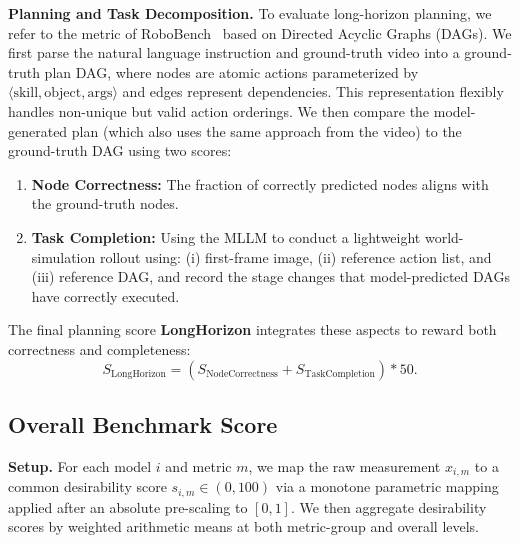 \begin{itemize}
\end{itemize}

\textbf{Planning and Task Decomposition.}
\label{ssec:dag}
To evaluate long-horizon planning, we refer to the metric of RoboBench~\cite{luo2025robobench} based on Directed Acyclic Graphs (DAGs). We first parse the natural language instruction and ground-truth video into a ground-truth plan DAG, where nodes are atomic actions parameterized by \(\langle \text{skill}, \text{object}, \text{args} \rangle\) and edges represent dependencies. This representation flexibly handles non-unique but valid action orderings. We then compare the model-generated plan (which also uses the same approach from the video) to the ground-truth DAG using two scores:
\begin{enumerate}
    \item \textbf{Node Correctness:} The fraction of correctly predicted nodes aligns with the ground-truth nodes.
    \item \textbf{Task Completion:} Using the MLLM to conduct a lightweight world-simulation rollout using: (i) first-frame image, (ii) reference action list, and (iii) reference DAG, and record the stage changes that model-predicted DAGs have correctly executed.
\end{enumerate}
The final planning score \textbf{LongHorizon} integrates these aspects to reward both correctness and completeness:
\[
S_{\text{LongHorizon}} = (S_{\text{NodeCorrectness}} + S_{\text{TaskCompletion}})*50.
\]

\subsection{Overall Benchmark Score}
\textbf{Setup.}
For each model $i$ and metric $m$, we map the raw measurement $x_{i,m}$ to a common desirability score
$s_{i,m}\in(0,100)$ via a monotone parametric mapping applied after an absolute pre-scaling to $[0,1]$.
We then aggregate desirability scores by weighted arithmetic means at both metric-group and overall levels.

